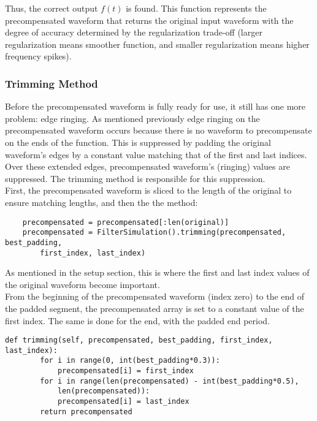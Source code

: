 Thus, the correct output $f(t)$ is found. This function represents the precompensated waveform that returns the original input waveform with the degree of accuracy determined by the regularization trade-off (larger regularization means smoother function, and smaller regularization means higher frequency spikes).

\subsubsection{Trimming Method}

Before the precompensated waveform is fully ready for use, it still has one more problem: edge ringing. As mentioned previously edge ringing on the precompensated waveform occurs because there is no waveform to precompensate on the ends of the function. This is suppressed by padding the original waveform's edges by a constant value matching that of the first and last indices. Over these extended edges, precompensated waveform's (ringing) values are suppressed. The trimming method is responsible for this suppression.
\\
First, the precompensated waveform is sliced to the length of the original to ensure matching lengths, and then the the method:

\begin{verbatim}
    precompensated = precompensated[:len(original)]
    precompensated = FilterSimulation().trimming(precompensated, best_padding, 
        first_index, last_index)
\end{verbatim}

As mentioned in the setup section, this is where the first and last index values of the original waveform become important.
\\
From the beginning of the precompensated waveform (index zero) to the end of the padded segment, the precompensated array is set to a constant value of the first index. The same is done for the end, with the padded end period.

\begin{verbatim}
def trimming(self, precompensated, best_padding, first_index, last_index):
        for i in range(0, int(best_padding*0.3)):
            precompensated[i] = first_index      
        for i in range(len(precompensated) - int(best_padding*0.5), 
            len(precompensated)):
            precompensated[i] = last_index
        return precompensated
\end{verbatim}

